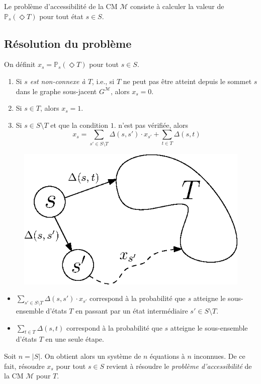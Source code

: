 \documentclass[12pt,a4paper]{report}
\theoremstyle{definition}%
\theoremstyle{remark}
\newcommand{\ie}{i.e., }
\let\labelitemi\labelitemii
\begin{document}
Le problème d'accessibilité de la CM $\mathcal{M}$ consiste à calculer la valeur de $\mathbb{P}_s(\Diamond T)$ pour tout état $s \in S$.

\subsection{Résolution du problème}
On définit $x_s = \mathbb{P}_s(\Diamond T)$ pour tout $s \in S$.
\begin{enumerate}
	\item Si \textit{$s$ est non-connexe à $T$}, \ie si $T$ ne peut pas être atteint depuis le sommet $s$ dans le graphe sous-jacent $G^\mathcal{M}$, alors $x_s = 0$.
	\item Si $s \in T$, alors $x_s = 1$.
	\item Si $s \in S \setminus T$ et que la condition $1.$ n'est pas vérifiée, alors
		\[ x_s = \sum_{s' \in S \setminus T} \Delta(s, s') \cdot x_{s'} + \sum_{t \in T} \Delta(s, t) \]
\end{enumerate}

\begin{figure}[H]
	\centering
	\includegraphics[scale=0.6]{figures/reachability.eps}
	\label{reachablity}
\end{figure}

\begin{itemize}
\renewcommand{\labelitemi}{\tiny$\bullet$}
	\item $ \sum_{s' \in S \setminus T}  \Delta(s, s') \cdot x_{s'} $ correspond à la probabilité que $s$ atteigne le sous-ensemble d'états $T$ en passant par un état intermédiaire $s' \in S \setminus T$.
	\item $\sum_{t \in T} \Delta(s, t)$ correspond à la probabilité que $s$ atteigne le sous-ensemble d'états $T$ en une seule étape.
\end{itemize}
Soit $n = |S|$. On obtient alors un système de $n$ équations à $n$ inconnues. De ce fait, résoudre $x_s$ pour tout $s\in S$ revient à résoudre le \textit{problème d'accessibilité} de la CM $\mathcal{M}$ pour $T$.
\end{document}
